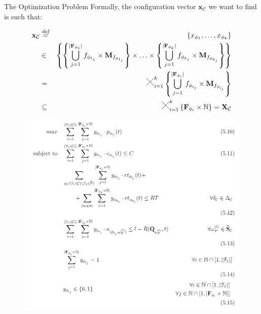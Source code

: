 \documentclass[13.5pt]{beamer}
\newcommand{\Cross}{\mathbin{\tikz [x=2.5ex,y=2.5ex,line width=.10ex] \draw (0,0) -- (1,1) (0,1) -- (1,0);}}
\newcommand{\mathDef}{\overset{\textit{def}}{=}}
\begin{document}
\begin{frame}{The Optimization Problem}
	Formally, the configuration vector $\textbf{x}_{\mathcal{C}}$ we want to find is such that:
	
	\begin{eqnarray}
		\textbf{x}_{\mathcal{C}} & \mathDef & \left\lbrace x_{\phi_{1}}, \ldots, x_{\phi_{k}} \right\rbrace \nonumber \\ 
		& \in & \left\{  \left\{ \bigcup_{j=1}^{|\textbf{F}_{\phi_{1}}|} f_{\phi_{1_j}} \times \textbf{M}_{f_{\phi_{1_j}}} \right\} \times \ldots \times \left\{ \bigcup_{j=1}^{|\textbf{F}_{\phi_{k}}|} f_{\phi_{k_j}} \times \textbf{M}_{f_{\phi_{k_j}}} \right\} \right\}  \nonumber \\
		& = & \Cross_{i = 1}^k \left\{ \bigcup_{j=1}^{|\textbf{F}_{\phi_{i}}|} f_{\phi_{i_j}} \times \textbf{M}_{f_{\phi_{i_j}}} \right\} \nonumber \\
		& \subseteq & \Cross_{i = 1}^k \left\{ \textbf{F}_{\phi_{i}} \times \mathbb{N} \right\} = \textbf{X}_{\mathcal{C}}
	\end{eqnarray}

\end{frame}


\begin{frame}
	
\begin{figure}[h]
	\centering
	\includegraphics[width=\textwidth,height=0.8\columnwidth]{../Images/MMKPForSlide.png}
\end{figure}
	
	
\end{frame}
\end{document}
